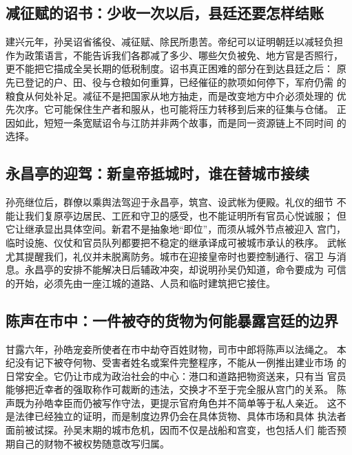 \subsection{减征赋的诏书：少收一次以后，县廷还要怎样结账}

建兴元年，孙吴诏省徭役、减征赋、除民所患苦。帝纪可以证明朝廷以减轻负担
作为政策语言，不能告诉我们各郡减了多少、哪些欠负被免、地方官是否照行，
更不能把它描成全吴长期的低税制度。诏书真正困难的部分在到达县廷之后：
原先已登记的户、田、役与仓粮如何重算，已经催征的款项如何停下，军府仍需
的粮食从何处补足。减征不是把国家从地方抽走，而是改变地方中介必须处理的
优先次序。它可能保住生产者和服从，也可能将压力转移到后来的征集与仓储。
正因如此，短短一条宽赋诏令与江防并非两个故事，而是同一资源链上不同时间
的选择。

\subsection{永昌亭的迎驾：新皇帝抵城时，谁在替城市接续}

孙亮继位后，群僚以乘舆法驾迎于永昌亭，筑宫、设武帐为便殿。礼仪的细节
不能让我们复原亭边居民、工匠和守卫的感受，也不能证明所有官员心悦诚服；
但它让继承显出具体空间。新君不是抽象地“即位”，而须从城外节点被迎入
宫门，临时设施、仪仗和官员队列都要把不稳定的继承译成可被城市承认的秩序。
武帐尤其提醒我们，礼仪并未脱离防务。城市在迎接皇帝时也要控制通行、宿卫
与消息。永昌亭的安排不能解决日后辅政冲突，却说明孙吴仍知道，命令要成为
可信的开始，必须先由一座江城的道路、人员和临时建筑把它接住。

\subsection{陈声在市中：一件被夺的货物为何能暴露宫廷的边界}

甘露六年，孙皓宠妾所使者在市中劫夺百姓财物，司市中郎将陈声以法绳之。
本纪没有记下被夺何物、受害者姓名或案件完整程序，不能从一例推出建业市场
的日常安全。它仍让市成为政治社会的中心：港口和道路把物资送来，只有当
官员能够把近幸者的强取称作可裁断的违法，交换才不至于完全服从宫门的关系。
陈声既为孙皓幸臣而仍被写作守法，更提示官府角色并不简单等于私人亲近。
这不是法律已经独立的证明，而是制度边界仍会在具体货物、具体市场和具体
执法者面前被试探。孙吴末期的城市危机，因而不仅是战船和宫变，也包括人们
能否预期自己的财物不被权势随意改写归属。
